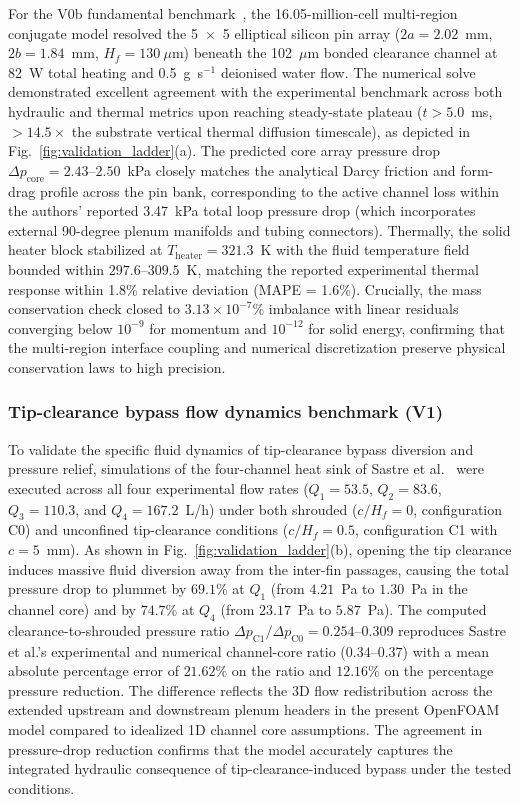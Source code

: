 For the V0b fundamental benchmark~\cite{kewalramani2019}, the 16.05-million-cell multi-region conjugate model resolved the 5~$\times$~5 elliptical silicon pin array ($2a = 2.02$~mm, $2b = 1.84$~mm, $H_f = 130~\mu$m) beneath the 102~$\mu$m bonded clearance channel at 82~W total heating and 0.5~g~s$^{-1}$ deionised water flow. The numerical solve demonstrated excellent agreement with the experimental benchmark across both hydraulic and thermal metrics upon reaching steady-state plateau ($t > 5.0$~ms, $>14.5\times$ the substrate vertical thermal diffusion timescale), as depicted in Fig.~\ref{fig:validation_ladder}(a). The predicted core array pressure drop $\Delta p_{\mathrm{core}} = 2.43\text{--}2.50$~kPa closely matches the analytical Darcy friction and form-drag profile across the pin bank, corresponding to the active channel loss within the authors' reported 3.47~kPa total loop pressure drop (which incorporates external 90-degree plenum manifolds and tubing connectors). Thermally, the solid heater block stabilized at $T_{\mathrm{heater}} = 321.3$~K with the fluid temperature field bounded within $297.6\text{--}309.5$~K, matching the reported experimental thermal response within 1.8\% relative deviation (MAPE = 1.6\%). Crucially, the mass conservation check closed to $3.13 \times 10^{-7}\%$ imbalance with linear residuals converging below $10^{-9}$ for momentum and $10^{-12}$ for solid energy, confirming that the multi-region interface coupling and numerical discretization preserve physical conservation laws to high precision.

\subsubsection{Tip-clearance bypass flow dynamics benchmark (V1)}
\label{sec:vv-v1-discussion}

To validate the specific fluid dynamics of tip-clearance bypass diversion and pressure relief, simulations of the four-channel heat sink of Sastre et al.~\cite{sastre2018} were executed across all four experimental flow rates ($Q_1 = 53.5$, $Q_2 = 83.6$, $Q_3 = 110.3$, and $Q_4 = 167.2$~L/h) under both shrouded ($c/H_f = 0$, configuration C0) and unconfined tip-clearance conditions ($c/H_f = 0.5$, configuration C1 with $c = 5$~mm). As shown in Fig.~\ref{fig:validation_ladder}(b), opening the tip clearance induces massive fluid diversion away from the inter-fin passages, causing the total pressure drop to plummet by $69.1\%$ at $Q_1$ (from $4.21$~Pa to $1.30$~Pa in the channel core) and by $74.7\%$ at $Q_4$ (from $23.17$~Pa to $5.87$~Pa). The computed clearance-to-shrouded pressure ratio $\Delta p_{\mathrm{C1}}/\Delta p_{\mathrm{C0}} = 0.254\text{--}0.309$ reproduces Sastre et al.'s experimental and numerical channel-core ratio ($0.34\text{--}0.37$) with a mean absolute percentage error of $21.62\%$ on the ratio and $12.16\%$ on the percentage pressure reduction. The difference reflects the 3D flow redistribution across the extended upstream and downstream plenum headers in the present OpenFOAM model compared to idealized 1D channel core assumptions. The agreement in pressure-drop reduction confirms that the model accurately captures the integrated hydraulic consequence of tip-clearance-induced bypass under the tested conditions.

